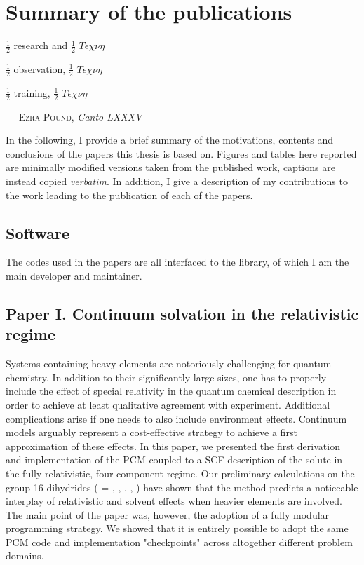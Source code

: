 \chapter{Summary of the publications}\label{ch:publications-summary}

\epigraph{$\frac{1}{2}$ research and $\frac{1}{2}\,\,T\acute{\epsilon}\chi\nu\eta$

          $\frac{1}{2}$ observation, $\frac{1}{2}\,\,T\acute{\epsilon}\chi\nu\eta$

          $\frac{1}{2}$ training, $\frac{1}{2}\,\,T\acute{\epsilon}\chi\nu\eta$}{
  --- \textsc{Ezra Pound}, \textit{Canto LXXXV}}

In the following, I provide a brief summary of the motivations, contents and
conclusions of the papers this thesis is based on.
Figures and tables here reported are minimally modified versions taken from the published work,
captions are instead copied \emph{verbatim}.
In addition, I give a description of my contributions to the work leading to
the publication of each of the papers.

\section*{Software}

The codes used in the papers are all interfaced to the \pcmsolver library,
of which I am the main developer and maintainer.

\section*{Paper I. Continuum solvation in the relativistic regime}

Systems containing heavy elements are notoriously challenging for quantum chemistry.
In addition to their significantly large sizes, one has to properly include the
effect of special relativity in the quantum chemical description in order to
achieve at least qualitative agreement with experiment.
Additional complications arise if one needs to also include environment effects.
Continuum models arguably represent a cost-effective strategy to achieve a first
approximation of these effects.
In this paper, we presented the first derivation and implementation of the \acs{PCM}
coupled to a \acs{SCF} description of the solute in the fully relativistic, four-component
regime.
Our preliminary calculations on the group 16 dihydrides  ( =
, , , , ) have shown that the method predicts
a noticeable interplay of relativistic and solvent effects when heavier
elements are involved.
The main point of the paper was, however, the adoption of a fully modular
programming strategy. We showed that it is entirely possible to adopt the same
\acs{PCM} code and implementation "checkpoints" across altogether different
problem domains.

